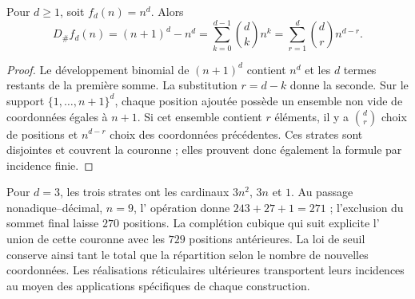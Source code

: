 \begin{proposition}
Pour \(d\geq1\), soit \(f_d(n)=n^d\). Alors
\begin{equation}
 D_\#f_d(n)=(n+1)^d-n^d
 =\sum_{k=0}^{d-1}\binom dk n^k
 =\sum_{r=1}^{d}\binom dr n^{d-r}.
 \label{mg07:binomio}
\end{equation}
\end{proposition}

\begin{proof}
Le développement binomial de \((n+1)^d\) contient \(n^d\) et les \(d\) termes restants de la première somme. La substitution \(r=d-k\) donne la seconde. Sur le support \(\{1,\ldots,n+1\}^d\), chaque position ajoutée possède un ensemble non vide de coordonnées égales à \(n+1\). Si cet ensemble contient \(r\) éléments, il y a \(\binom dr\) choix de positions et \(n^{d-r}\) choix des coordonnées précédentes. Ces strates sont disjointes et couvrent la couronne ; elles prouvent donc également la formule par incidence finie.
\end{proof}

Pour \(d=3\), les trois strates ont les cardinaux \(3n^2\),
\(3n\) et \(1\). Au passage nonadique--décimal, \(n=9\), l'
opération donne \(243+27+1=271\) ; l'exclusion du sommet final laisse
\(270\) positions. La complétion cubique qui suit explicite l'
union de cette couronne avec les \(729\) positions antérieures. La loi
de seuil conserve ainsi tant le total que la répartition selon le nombre
de nouvelles coordonnées. Les réalisations réticulaires ultérieures
transportent leurs incidences au moyen des applications spécifiques de chaque
construction.

